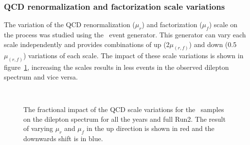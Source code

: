 \subsubsection{QCD renormalization and factorization scale variations}
The variation of the QCD renormalization ($\mu_r$) and factorization ($\mu_f$) scale on the process was studied using the \sherpa\ event generator. This generator can vary each scale independently and provides combinations of up (2$\mu_(r,f)$) and down (0.5$\mu_(r,f)$) variations of each scale. The impact of these scale variations is shown in figure~\ref{fig:QCDscale_mjj}, increasing the scales results in less events in the observed dilepton \pt spectrum and vice versa.
\begin{figure}[h!]
  \centering
   \\
  \caption{The fractional impact of the QCD scale variations for the \sherpa~samples on the dilepton \pt spectrum for all the years and full Run2. The result of varying $\mu_r$ and $\mu_f$ in the up direction is shown in red and the downwards shift is in blue.}
  \label{fig:QCDscale_mjj}
\end{figure}



